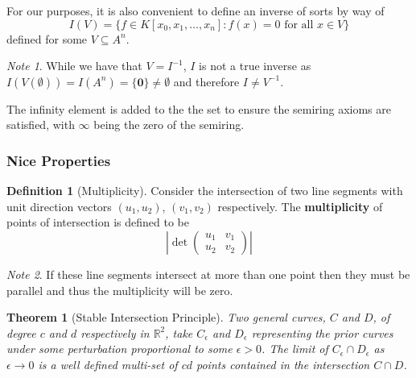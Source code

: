 \documentclass[12pt,a4paper]{amsart}
\newcommand{\R}{\mathbb{R}}
\newcommand{\T}{\mathbb{T}}
\newtheorem{thm}{Theorem}[section]
\theoremstyle{definition}
\newtheorem{defn}{Definition}[section]
\theoremstyle{remark}
\newtheorem*{note}{Note}
\begin{document}
For our purposes, it is also convenient to define an inverse of sorts by way of
\begin{equation}
    I(V) = \{ f\in K[x_0,x_1,\dots,x_n] : f(x) = 0\text{ for all }x\in V \}
\end{equation}
defined for some $V\subseteq A^n$.
\begin{note}
While we have that $V = I^{-1}$, $I$ is not a true inverse as $I(V(\emptyset)) = I(A^n) = \{ \boldsymbol{0} \} \neq \emptyset$ and therefore $I \neq V^{-1}$.
\end{note}


The infinity element is added to the the set to ensure the semiring axioms are satisfied, with $\infty$ being the zero of the semiring. 

\subsubsection{Nice Properties}

\begin{defn}[Multiplicity]
Consider the intersection of two line segments with unit direction vectors $(u_1,u_2)$, $(v_1,v_2)$ respectively.
The \textbf{multiplicity} of points of intersection is defined to be
\begin{equation}
    \left|\det
    \begin{pmatrix}
        u_1 & v_1\\
        u_2 & v_2
    \end{pmatrix}
    \right|
\end{equation}
\end{defn}
\begin{note}
If these line segments intersect at more than one point then they must be parallel and thus the multiplicity will be zero.
\end{note}


\begin{thm}[Stable Intersection Principle]
Two general curves, $C$ and $D$, of degree $c$ and $d$ respectively in $\R^2$, take $C_{\epsilon}$ and $D_\epsilon$ representing the prior curves under some perturbation proportional to some $\epsilon>0$.
The limit of $C_\epsilon\cap D_\epsilon$ as $\epsilon\to0$ is a well defined multi-set of $c d$ points contained in the intersection $C\cap D$.
\end{thm}
\end{document}
